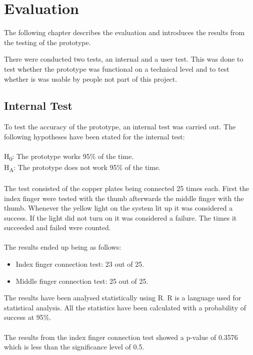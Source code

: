 \chapter{Evaluation}

The following chapter describes the evaluation and introduces the results from the testing of the prototype. 

There were conducted two tests, an internal and a user test. This was done to test whether the prototype was functional on a technical level and to test whether is was usable by people not part of this project. 


\section{Internal Test}

To test the accuracy of the prototype, an internal test was carried out. The following hypotheses have been stated for the internal test: \\\\
H\textsubscript{0}: The prototype works 95\% of the time.\\
H\textsubscript{A}: The prototype does not work 95\% of the time.\\\\

The test consisted of the copper plates being connected 25 times each. First the index finger were tested with the thumb afterwards the middle finger with the thumb. Whenever the yellow light on the system lit up it was considered a success. If the light did not turn on it was considered a failure. The times it succeeded and failed were counted.\\\\

The results ended up being as follows:\\
\begin{itemize}
\item Index finger connection test: 23 out of 25. \\
\item Middle finger connection test: 25 out of 25.\\
\end{itemize}


The results have been analysed statistically using R\citep{R}. R is a language used for statistical analysis. All the statistics have been calculated with a probability of success at 95\%.\\\\
The results from the index finger connection test showed a p-value of 0.3576 which is less than the significance level of 0.5. 

